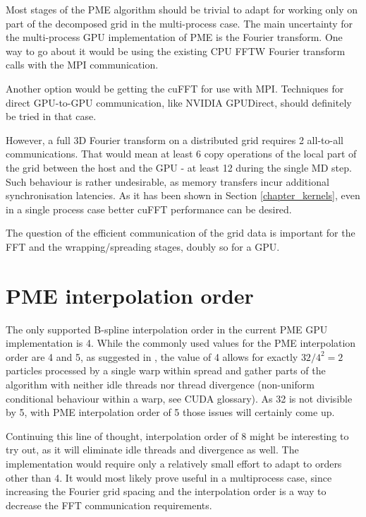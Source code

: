 \documentclass[12pt,a4paper,notitlepage]{report}
\begin{document}
Most stages of the PME algorithm should be trivial to adapt for working only on part of the decomposed grid in the multi-process case.
The main uncertainty for the multi-process GPU implementation of PME is the Fourier transform. One way to go about it would be using the existing CPU FFTW Fourier transform calls with the MPI communication.

Another option would be getting the cuFFT for use with MPI. Techniques for direct GPU-to-GPU communication, like NVIDIA GPUDirect, should definitely be tried in that case.

However, a full 3D Fourier transform on a distributed grid requires 2 all-to-all communications. That would mean at least 6 copy operations of the local part of the grid between the host and the GPU - at least 12 during the single MD step. Such behaviour is rather undesirable, as memory transfers incur additional synchronisation latencies.
As it has been shown in Section \ref{chapter_kernels}, even in a single process case better cuFFT performance can be desired.

The question of the efficient communication of the grid data is important for the FFT and the wrapping/spreading stages, doubly so for a GPU.
 
\section{PME interpolation order}
The only supported B-spline interpolation order in the current PME GPU implementation is 4. While the commonly used values for the PME interpolation order are 4 and 5, as suggested in \cite{spme}, the value of 4 allows for exactly $32/4^2 = 2$ particles processed by a single warp within spread and gather parts of the algorithm with neither idle threads nor thread divergence (non-uniform conditional behaviour within a warp, see CUDA glossary). As 32 is not divisible by 5, with PME interpolation order of 5 those issues will certainly come up.

Continuing this line of thought, interpolation order of 8 might be interesting to try out, as it will eliminate idle threads and divergence as well. The implementation would require only a relatively small effort to adapt to orders other than 4. It would most likely prove useful in a multiprocess case, since increasing the Fourier grid spacing and the interpolation order is a way to decrease the FFT communication requirements.
\end{document}
